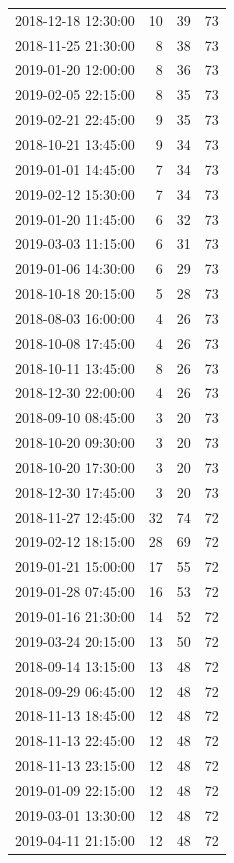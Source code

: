 \begin{tabular}{lrrr}
2018-12-18 12:30:00 & 10 & 39 & 73 \\
2018-11-25 21:30:00 & 8 & 38 & 73 \\
2019-01-20 12:00:00 & 8 & 36 & 73 \\
2019-02-05 22:15:00 & 8 & 35 & 73 \\
2019-02-21 22:45:00 & 9 & 35 & 73 \\
2018-10-21 13:45:00 & 9 & 34 & 73 \\
2019-01-01 14:45:00 & 7 & 34 & 73 \\
2019-02-12 15:30:00 & 7 & 34 & 73 \\
2019-01-20 11:45:00 & 6 & 32 & 73 \\
2019-03-03 11:15:00 & 6 & 31 & 73 \\
2019-01-06 14:30:00 & 6 & 29 & 73 \\
2018-10-18 20:15:00 & 5 & 28 & 73 \\
2018-08-03 16:00:00 & 4 & 26 & 73 \\
2018-10-08 17:45:00 & 4 & 26 & 73 \\
2018-10-11 13:45:00 & 8 & 26 & 73 \\
2018-12-30 22:00:00 & 4 & 26 & 73 \\
2018-09-10 08:45:00 & 3 & 20 & 73 \\
2018-10-20 09:30:00 & 3 & 20 & 73 \\
2018-10-20 17:30:00 & 3 & 20 & 73 \\
2018-12-30 17:45:00 & 3 & 20 & 73 \\
2018-11-27 12:45:00 & 32 & 74 & 72 \\
2019-02-12 18:15:00 & 28 & 69 & 72 \\
2019-01-21 15:00:00 & 17 & 55 & 72 \\
2019-01-28 07:45:00 & 16 & 53 & 72 \\
2019-01-16 21:30:00 & 14 & 52 & 72 \\
2019-03-24 20:15:00 & 13 & 50 & 72 \\
2018-09-14 13:15:00 & 13 & 48 & 72 \\
2018-09-29 06:45:00 & 12 & 48 & 72 \\
2018-11-13 18:45:00 & 12 & 48 & 72 \\
2018-11-13 22:45:00 & 12 & 48 & 72 \\
2018-11-13 23:15:00 & 12 & 48 & 72 \\
2019-01-09 22:15:00 & 12 & 48 & 72 \\
2019-03-01 13:30:00 & 12 & 48 & 72 \\
2019-04-11 21:15:00 & 12 & 48 & 72 \\

\end{tabular}

